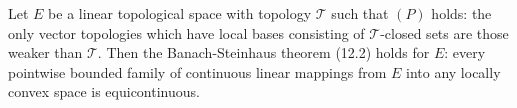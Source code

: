 Let $E$ be a linear topological space with topology $\mathcal{T}$ such that $(P)$ holds: the only vector topologies which have local bases consisting of $\mathcal{T}$-closed sets are those weaker than $\mathcal{T}$. Then the Banach-Steinhaus theorem (12.2) holds for $E$: every pointwise bounded family of continuous linear mappings from $E$ into any locally convex space is equicontinuous.
